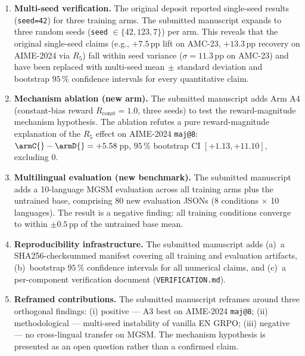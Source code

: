 \documentclass[11pt]{article}
\begin{document}
\begin{enumerate}[itemsep=4pt]

\item \textbf{Multi-seed verification.}
The original deposit reported single-seed results (\texttt{seed=42})
for three training arms. The submitted manuscript expands to three
random seeds (\texttt{seed} $\in \{42, 123, 7\}$) per arm. This
reveals that the original single-seed claims (e.g., $+7.5$\,pp lift
on AMC-23, $+13.3$\,pp recovery on AIME-2024 via $R_5$) fall within
seed variance ($\sigma = 11.3$\,pp on AMC-23) and have been replaced
with multi-seed mean$\,\pm\,$standard deviation and bootstrap
$95\,\%$ confidence intervals for every quantitative claim.

\item \textbf{Mechanism ablation (new arm).}
The submitted manuscript adds Arm A4 (constant-bias reward
$R_{\text{const}}=1.0$, three seeds) to test the reward-magnitude
mechanism hypothesis. The ablation refutes a pure reward-magnitude
explanation of the $R_5$ effect on AIME-2024 \texttt{maj@8}:
$\armC{}-\armD{} = +5.58$\,pp, $95\,\%$ bootstrap CI
$[+1.13, +11.10]$, excluding $0$.

\item \textbf{Multilingual evaluation (new benchmark).}
The submitted manuscript adds a 10-language MGSM evaluation across all
training arms plus the untrained base, comprising 80 new evaluation
JSONs (8 conditions $\times$ 10 languages). The result is a negative
finding: all training conditions converge to within $\pm 0.5$\,pp of
the untrained base mean.

\item \textbf{Reproducibility infrastructure.}
The submitted manuscript adds (a)~a SHA256-checksummed manifest
covering all training and evaluation artifacts, (b)~bootstrap
$95\,\%$ confidence intervals for all numerical claims, and (c)~a
per-component verification document (\texttt{VERIFICATION.md}).

\item \textbf{Reframed contributions.}
The submitted manuscript reframes around three orthogonal findings:
(i) positive --- A3 best on AIME-2024 \texttt{maj@8};
(ii) methodological --- multi-seed instability of vanilla EN GRPO;
(iii) negative --- no cross-lingual transfer on MGSM. The mechanism
hypothesis is presented as an open question rather than a confirmed
claim.

\end{enumerate}

\vspace{1em}
\end{document}
